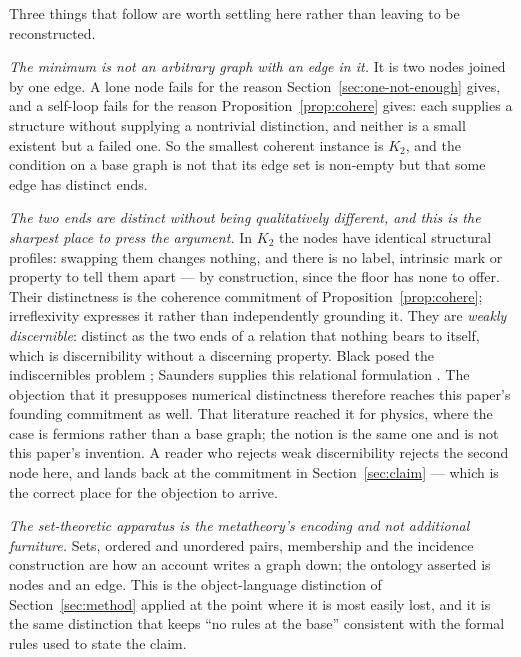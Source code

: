 \documentclass[11pt,a4paper]{article}
\theoremstyle{remark}\newtheorem{remark}[proposition]{Remark}
\begin{document}
Three things that follow are worth settling here rather than leaving to be reconstructed.

\emph{The minimum is not an arbitrary graph with an edge in it.} It is two nodes joined by one edge.
A lone node fails for the reason Section~\ref{sec:one-not-enough} gives, and a self-loop fails for the
reason Proposition~\ref{prop:cohere} gives: each supplies a structure without supplying a nontrivial
distinction, and neither is a small existent but a failed one. So the smallest coherent instance is
$K_2$, and the condition on a base graph is not that its edge set is non-empty but that some edge has
distinct ends.

\emph{The two ends are distinct without being qualitatively different, and this is the sharpest place
to press the argument.} In $K_2$ the nodes have identical structural profiles: swapping them changes
nothing, and there is no label, intrinsic mark or property to tell them apart --- by construction,
since the floor has none to offer. Their distinctness is the coherence commitment of Proposition~\ref{prop:cohere}; irreflexivity expresses it rather than independently grounding it. They are \emph{weakly discernible}: distinct as the two ends of a relation that nothing bears to
itself, which is discernibility without a discerning property. Black posed the indiscernibles problem \citep{black1952}; Saunders supplies this relational formulation \citep{saunders2003}. The objection that it presupposes numerical distinctness therefore reaches this paper's founding commitment as well. That literature reached it for
physics, where the case is fermions rather than a base graph; the notion is the same one and is not
this paper's invention. A reader who rejects weak discernibility rejects the second node here, and
lands back at the commitment in Section~\ref{sec:claim} --- which is the correct place for the
objection to arrive.

\emph{The set-theoretic apparatus is the metatheory's encoding and not additional furniture.} Sets,
ordered and unordered pairs, membership and the incidence construction are how an account writes a
graph down; the ontology asserted is nodes and an edge. This is the object-language distinction of
Section~\ref{sec:method} applied at the point where it is most easily lost, and it is the same
distinction that keeps ``no rules at the base'' consistent with the formal rules used to state the
claim.
\end{document}
